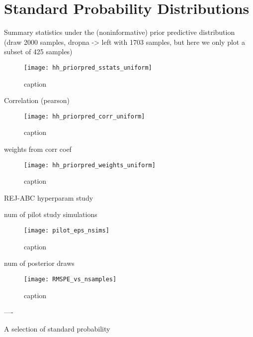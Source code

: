 \chapter{Standard Probability Distributions}\label{sec:Appendix A}


Summary statistics under the (noninformative) prior predictive distribution (draw 2000 samples, dropna -> left with 1703 samples, but here we only plot a subset of 425 samples)

\begin{figure}[H]
    \centering
    \texttt{[image: hh\_priorpred\_sstats\_uniform]}
    \caption{caption}
    \label{fig:fig1}
\end{figure} 


Correlation (pearson) 

\begin{figure}[H]
    \centering
    \texttt{[image: hh\_priorpred\_corr\_uniform]}
    \caption{caption}
    \label{fig:fig1}
\end{figure} 

weights from corr coef

\begin{figure}[H]
    \centering
    \texttt{[image: hh\_priorpred\_weights\_uniform]}
    \caption{caption}
    \label{fig:fig1}
\end{figure} 

 
REJ-ABC hyperparam study 

num of pilot study simulations 

\begin{figure}[H]
    \centering
    \texttt{[image: pilot\_eps\_nsims]}
    \caption{caption}
    \label{fig:fig1}
\end{figure} 

num of posterior draws

\begin{figure}[H]
    \centering
    \texttt{[image: RMSPE\_vs\_nsamples]}
    \caption{caption}
    \label{fig:fig1}
\end{figure} 

----


A selection of standard probability 

